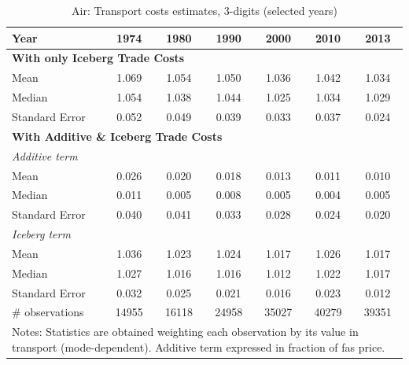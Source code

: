 \documentclass[a4paper,11pt]{article}
\begin{document}
\begin{table}[htbp]
  \centering
  \caption{Air: Transport costs estimates, 3-digits (selected years)}
\begin{center}
    \begin{tabular}{l|cccccc}
\hline\hline

Year & 1974  & 1980  & 1990  & 2000  & 2010  & 2013   \\ \hline
\multicolumn{7}{l}{\textbf{With only Iceberg Trade Costs}}     \\ \hline
Mean  & 1.069 & 1.054 & 1.050 & 1.036 & 1.042 & 1.034  \\
Median & 1.054 & 1.038 & 1.044 & 1.025 & 1.034 & 1.029  \\
Standard Error & 0.052 & 0.049 & 0.039 & 0.033 & 0.037 & 0.024 \\
\hline
\multicolumn{7}{l}{\textbf{With Additive \& Iceberg Trade Costs }}    \\ \hline
\multicolumn{7}{l}{\textit{Additive term }}     \\ \hline
\multicolumn{1}{l}{Mean } & 0.026 & 0.020 & 0.018 & 0.013 & 0.011 & 0.010  \\
\multicolumn{1}{l}{Median} & 0.011 & 0.005 & 0.008 & 0.005 & 0.004 & 0.005  \\
\multicolumn{1}{l}{Standard Error} & 0.040 & 0.041 & 0.033 & 0.028 & 0.024 & 0.020  \\ \hline
\multicolumn{7}{l}{\textit{Iceberg term}}  \\ \hline
\multicolumn{1}{l}{Mean } & 1.036 & 1.023 & 1.024 & 1.017 & 1.026 & 1.017  \\
\multicolumn{1}{l}{Median} & 1.027 & 1.016 & 1.016 & 1.012 & 1.022 & 1.017 \\
Standard Error & 0.032 & 0.025 & 0.021 & 0.016 & 0.023 & 0.012  \\ \hline
\# observations & 14955 & 16118 & 24958 & 35027 & 40279 & 39351  \\
\hline\hline
\multicolumn{7}{l}{\parbox[l]{11cm}{ \vspace{7pt}\scriptsize{Notes: Statistics are obtained weighting each observation by its value in transport (mode-dependent). Additive term expressed in fraction of fas price.}}}
\end{tabular}%
\end{center}
\label{tab:result_air_3d_detail}
\end{table}%
\end{document}
